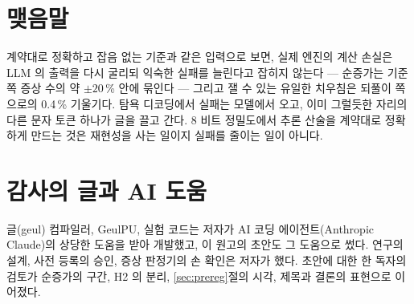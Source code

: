 \documentclass[11pt]{article}
\begin{document}
\section{맺음말}\label{sec:conclusion}

계약대로 정확하고 잡음 없는 기준과 같은 입력으로 보면, 실제 엔진의 계산 손실은 LLM 의 출력을 다시 굴리되 익숙한 실패를
늘린다고 잡히지 않는다 --- 순증가는 기준 쪽 증상 수의 약 $\pm20$\,\% 안에 묶인다 --- 그리고 잴 수 있는 유일한 치우침은 되풀이
쪽으로의 0.4\,\% 기울기다. 탐욕 디코딩에서 실패는 모델에서 오고, 이미 그럴듯한 자리의 다른 문자 토큰 하나가 글을 끌고 간다. 8
비트 정밀도에서 추론 산술을 계약대로 정확하게 만드는 것은 재현성을 사는 일이지 실패를 줄이는 일이 아니다.

\section*{감사의 글과 AI 도움}

글(geul) 컴파일러, GeulPU, 실험 코드는 저자가 AI 코딩 에이전트(Anthropic Claude)의 상당한 도움을 받아 개발했고, 이 원고의
초안도 그 도움으로 썼다. 연구의 설계, 사전 등록의 승인, 증상 판정기의 손 확인은 저자가 했다. 초안에 대한 한 독자의 검토가
순증가의 구간, H2 의 분리, \ref{sec:prereg}절의 시각, 제목과 결론의 표현으로 이어졌다.
\end{document}
